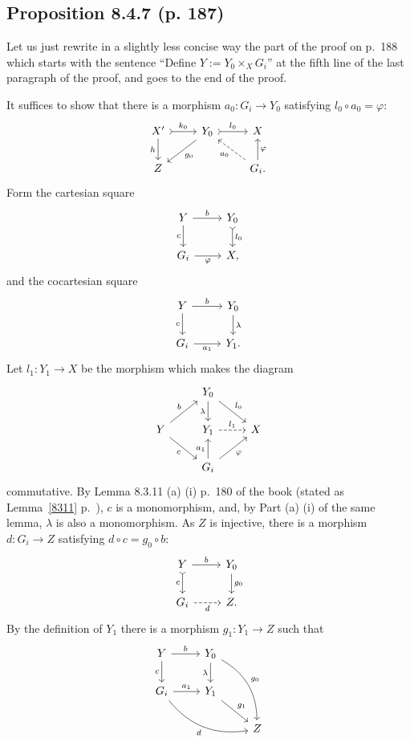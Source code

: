 \documentclass[12pt]{article}%
\theoremstyle{remark}
\theoremstyle{definition}
\newcommand{\pp}{\varphi}
\begin{document}

\subsection{Proposition 8.4.7 (p. 187)}

Let us just rewrite in a slightly less concise way the part of the proof on p.~188 which starts with the sentence ``Define $Y:=Y_0\times_XG_i$'' at the fifth line of the last paragraph of the proof, and goes to the end of the proof. 

It suffices to show that there is a morphism $a_0:G_i\to Y_0$ satisfying $l_0\circ a_0=\pp$:
$$
\begin{tikzcd}
X'\ar{d}[swap]{h}\ar[tail]{r}{k_0}&Y_0\ar{dl}{g_0}\ar[tail]{r}{l_0}&X\\ 
Z&&G_i.\ar[dashed]{ul}{a_0}\ar{u}[swap]{\pp}
\end{tikzcd}
$$ 
Form the cartesian square 
$$
\begin{tikzcd}
Y\ar{r}{b}\ar[swap]{d}{c}&Y_0\ar[tail]{d}{l_0}\\
G_i\ar[swap]{r}{\pp}&X,
\end{tikzcd}
$$
and the cocartesian square 
$$
\begin{tikzcd}
Y\ar{r}{b}\ar[swap]{d}{c}&Y_0\ar{d}{\lambda}\\
G_i\ar[swap]{r}{a_1}&Y_1.
\end{tikzcd}
$$ 
Let $l_1:Y_1\to X$ be the morphism which makes the diagram 
$$
\begin{tikzcd}
{}&Y_0\ar{d}[swap]{\lambda}\ar{dr}{l_0}\\ 
Y\ar{ur}{b}\ar{dr}[swap]{c}&Y_1\ar[dashed]{r}{l_1}&X\\ 
{}&G_i\ar{u}{a_1}\ar{ru}[swap]{\pp}
\end{tikzcd}
$$ 
commutative. By Lemma 8.3.11 (a) (i) p.~180 of the book (stated as Lemma~\ref{8311} p.~\pageref{8311}), $c$ is a monomorphism, and, by Part (a) (i) of the same lemma, $\lambda$ is also a monomorphism. As $Z$ is injective, there is a morphism $d:G_i\to Z$ satisfying $d\circ c=g_0\circ b$: 
$$
\begin{tikzcd}
Y\ar{r}{b}\ar[tail]{d}[swap]{c}&Y_0\ar{d}{g_0}\\ 
G_i\ar[dashed]{r}[swap]{d}&Z.
\end{tikzcd}
$$ 
By the definition of $Y_1$ there is a morphism $g_1:Y_1\to Z$ such that 
$$
\begin{tikzcd}
Y\ar{r}{b}\ar[swap]{d}{c}&Y_0\ar{d}[swap]{\lambda}\ar[bend left]{ddr}{g_0}\\
G_i\ar{r}{a_1}\ar[bend right]{rrd}[swap]{d}&Y_1\ar{dr}{g_1}\\ 
{}&{}&Z
\end{tikzcd}
$$ 
\end{document}
